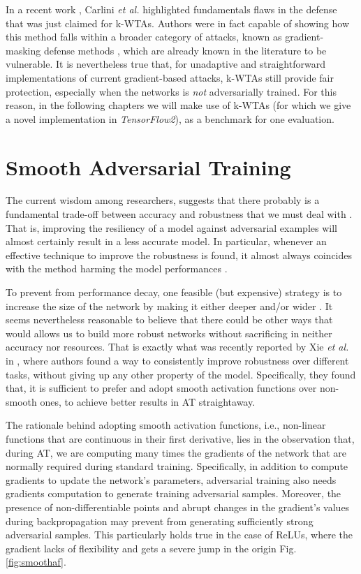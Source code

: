 \documentclass[LaM,binding=0.6cm]{./packages/sapthesis/sapthesis}
\begin{document}
    In a recent work \cite{carlinikwta}, Carlini \textit{et al.} highlighted fundamentals flaws in the defense that was just claimed for k-WTAs.
    Authors were in fact capable of showing how this method falls within a broader category of attacks, known as gradient-masking
    defense methods \cite{adv_survey2}, which are already known in the literature to be vulnerable.
    It is nevertheless true that, for unadaptive and straightforward implementations of current gradient-based attacks, k-WTAs
    still provide fair protection, especially when the networks is \textit{not} adversarially trained. For this reason, in the following chapters
    we will make use of k-WTAs (for which we give a novel implementation in \textit{TensorFlow2}), as a benchmark for one evaluation.

    \section{Smooth Adversarial Training}
    \label{SAT}

    The current wisdom among researchers, suggests that there probably is a fundamental trade-off between accuracy and robustness that we must deal with
    \cite{freelunch}. That is, improving the resiliency of a model against adversarial examples will almost certainly 
    result in a less accurate model. In particular, whenever an effective technique to improve the robustness is found, it almost always coincides with the method harming
    the model performances \cite{robustness_accuracy}.
    
    To prevent from performance decay, one feasible (but expensive) strategy is to increase the size of the network by making it either deeper and/or wider \cite{scaleintriguing}.
    It seems nevertheless reasonable to believe that there could be other ways that would allows us to build more robust networks without 
    sacrificing in neither accuracy nor resources. That is exactly what was recently reported by Xie \textit{et al.} in \cite{smooth_adversarial_training}, where authors 
    found a way to consistently improve robustness over different tasks, without giving up any other property of the model. Specifically, they found that,
    it is sufficient to prefer and adopt smooth activation functions over non-smooth ones, to achieve 
    better results in AT straightaway.

    The rationale behind adopting smooth activation functions, i.e., non-linear functions that are continuous in their first derivative, lies in the 
    observation that, during AT, we are computing many times the gradients of the network that are normally required during standard training. Specifically,
    in addition to compute gradients to update the network's parameters, adversarial training also needs gradients computation to generate training 
    adversarial samples. Moreover, the presence of non-differentiable points and abrupt changes in the gradient's values during backpropagation may 
    prevent from generating sufficiently strong adversarial samples. This particularly holds true in the case of ReLUs, where the gradient lacks of flexibility 
    and gets a severe jump in the origin Fig. \ref{fig:smoothaf}. 
\end{document}
